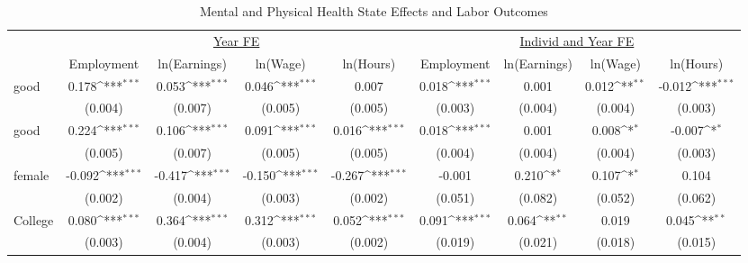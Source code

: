\def\sym#1{\ifmmode^{#1}\else\(^{#1}\)\fi}
\begin{table}
\center\caption{Mental and Physical Health State Effects and Labor Outcomes}
\footnotesize
\begin{tabular}{l*{8}{c}}
                    &\multicolumn{4}{c}{\underline{Year FE}}                                                &\multicolumn{4}{c}{\underline{Individ and Year FE}}                                    \\\cmidrule(lr){2-5}\cmidrule(lr){6-9}
                    &\multicolumn{1}{c}{Employment}&\multicolumn{1}{c}{ln(Earnings)}&\multicolumn{1}{c}{ln(Wage)}&\multicolumn{1}{c}{ln(Hours)}&\multicolumn{1}{c}{Employment}&\multicolumn{1}{c}{ln(Earnings)}&\multicolumn{1}{c}{ln(Wage)}&\multicolumn{1}{c}{ln(Hours)}\\
\hline
good                &       0.178\sym{***}&       0.053\sym{***}&       0.046\sym{***}&       0.007         &       0.018\sym{***}&       0.001         &       0.012\sym{**} &      -0.012\sym{***}\\
                    &     (0.004)         &     (0.007)         &     (0.005)         &     (0.005)         &     (0.003)         &     (0.004)         &     (0.004)         &     (0.003)         \\
good                &       0.224\sym{***}&       0.106\sym{***}&       0.091\sym{***}&       0.016\sym{***}&       0.018\sym{***}&       0.001         &       0.008\sym{*}  &      -0.007\sym{*}  \\
                    &     (0.005)         &     (0.007)         &     (0.005)         &     (0.005)         &     (0.004)         &     (0.004)         &     (0.004)         &     (0.003)         \\
female              &      -0.092\sym{***}&      -0.417\sym{***}&      -0.150\sym{***}&      -0.267\sym{***}&      -0.001         &       0.210\sym{*}  &       0.107\sym{*}  &       0.104         \\
                    &     (0.002)         &     (0.004)         &     (0.003)         &     (0.002)         &     (0.051)         &     (0.082)         &     (0.052)         &     (0.062)         \\
College             &       0.080\sym{***}&       0.364\sym{***}&       0.312\sym{***}&       0.052\sym{***}&       0.091\sym{***}&       0.064\sym{**} &       0.019         &       0.045\sym{**} \\
                    &     (0.003)         &     (0.004)         &     (0.003)         &     (0.002)         &     (0.019)         &     (0.021)         &     (0.018)         &     (0.015)         \\

\end{tabular}
\end{table}
